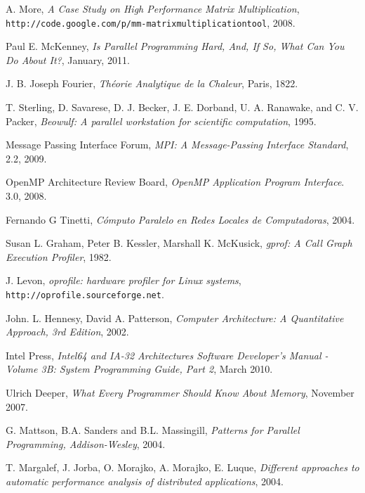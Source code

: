 \documentclass[a4paper]{report}
\begin{document}
\begin{thebibliography}{9}

  A. More,
  \emph{A Case Study on High Performance Matrix Multiplication},
  {\tt http://code.google.com/p/mm-matrixmultiplicationtool},
  2008.

  Paul E. McKenney,
  \emph{Is Parallel Programming Hard, And, If So, What Can You Do About It?},
  January, 2011.

  J. B. Joseph Fourier, \emph{Th\'eorie Analytique de la Chaleur}, Paris, 1822.

  T. Sterling, D. Savarese, D. J. Becker, J. E. Dorband, U. A. Ranawake,
  and C. V. Packer,
  \emph{Beowulf: A parallel workstation for scientific computation},
  1995.

  Message Passing Interface Forum,
  \emph{MPI: A Message-Passing Interface Standard},
  2.2,
  2009.

  OpenMP Architecture Review Board,
  \emph{OpenMP Application Program Interface}.
  3.0,
  2008.

  Fernando G Tinetti,
  \emph{C\'omputo Paralelo en Redes Locales de Computadoras},
  2004.

  Susan L. Graham,  Peter B. Kessler,  Marshall K. McKusick,
  \emph{gprof: A Call Graph Execution Profiler},
  1982.
  
  J. Levon,
  \emph{oprofile: hardware profiler for Linux systems},
       {\tt http://oprofile.sourceforge.net}.
  
  John. L. Hennesy, David A. Patterson,
  \emph{Computer Architecture: A Quantitative Approach, 3rd Edition},
  2002.

  Intel Press,
  \emph{Intel64 and IA-32 Architectures Software Developer's Manual - Volume
    3B: System Programming Guide, Part 2},
  March 2010.

  Ulrich Deeper,
  \emph{What Every Programmer Should Know About Memory},
  November 2007.

  G. Mattson, B.A. Sanders and B.L. Massingill, 
  \emph{Patterns for Parallel Programming, Addison-Wesley},
  2004.
  
  T. Margalef, J. Jorba, O. Morajko, A. Morajko, E. Luque,
  \emph{Different approaches to automatic performance analysis of distributed
    applications},
  2004.
  

\end{thebibliography}
\end{document}
